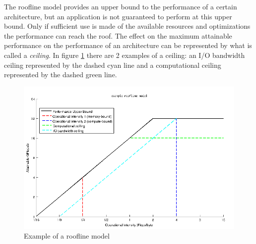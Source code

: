The roofline model provides an upper bound to the performance of a certain architecture, but an application is not guaranteed to perform at this upper bound. Only if sufficient use is made of the available resources and optimizations the performance can reach the roof. The effect on the maximum attainable performance on the performance of an architecture can be represented by what is called a \emph{ceiling}. In figure \ref{img:roofline_example} there are 2 examples of a ceiling: an I/O bandwidth ceiling represented by the dashed cyan line and a computational ceiling represented by the dashed green line. 

\begin{figure}[H]
\centering
\includegraphics[scale=0.6]{./images/matlab_plots/roofline_example.png}
\caption{Example of a roofline model}
\label{img:roofline_example}
\end{figure}

